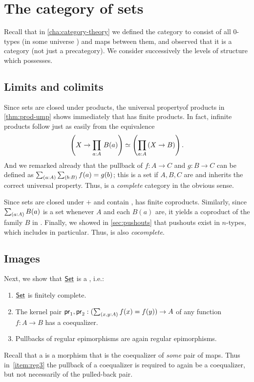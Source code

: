 \section{The category of sets}
\label{sec:piw-pretopos}

Recall that in \autoref{cha:category-theory} we defined the category \uset to consist of all $0$-types (in some universe \UU) and maps between them, and observed that it is a category (not just a precategory).
We consider successively the levels of structure which \uset possesses.

\subsection{Limits and colimits}
\label{subsec:limits-sets}

Since sets are closed under products, the universal propertyof products in \autoref{thm:prod-ump} shows immediately that \uset has finite products.
In fact, infinite products follow just as easily from the equivalence
\[ \left(X\to \prd{a:A} B(a) \right) \simeq \left(\prd{a:A} (X\to B)\right) .\]
And we remarked already that the pullback of $f:A\to C$ and $g:B\to C$ can be defined as $\sm{a:A}{b:B} f(a)=g(b)$; this is a set if $A,B,C$ are and inherits the correct universal property.
Thus, \uset is a \emph{complete} category in the obvious sense.

Since sets are closed under $+$ and contain \emptyt, \uset has finite coproducts.
Similarly, since $\sm{a:A}B(a)$ is a set whenever $A$ and each $B(a)$ are, it yields a coproduct of the family $B$ in \uset.
Finally, we showed in \autoref{sec:pushouts} that pushouts exist in $n$-types, which includes \uset in particular.
Thus, \uset is also \emph{cocomplete}.

\subsection{Images}
\label{sec:image}

Next, we show that $\underline{\mathsf{Set}}$ is a , i.e.:
%
\begin{enumerate}
\item $\underline{\mathsf{Set}}$ is finitely complete.\label{item:reg1}
\item The kernel pair $\proj1,\proj2: (\sm{x,y:A} f(x)= f(y)) \to A$ of any
      function $f : A \to B$ has a coequalizer.\label{item:reg2}
\item Pullbacks of regular epimorphisms are again regular epimorphisms.\label{item:reg3}
\end{enumerate}
%
Recall that a  is a morphism that is the coequalizer of \emph{some} pair of maps.
Thus in~\ref{item:reg3} the pullback of a coequalizer is required to again be a coequalizer, but not necessarily of the pulled-back pair.

